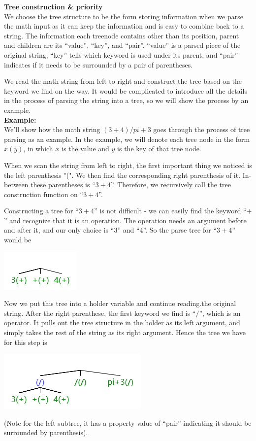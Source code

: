 \documentclass[11pt]{article}
\theoremstyle{definition}
\begin{document}
\begin{enumerate}
\textbf{Tree construction \& priority} \\
We choose the tree structure to be the form storing information when we parse the math input as it can keep the information and is easy to combine back to a string. The information each treenode contains other than its position, parent and children are its “value”, “key”, and “pair”.  “value” is a parsed piece of the original string, “key” tells which keyword is used under its parent, and “pair” indicates if it needs to be surrounded by a pair of parentheses.

We read the math string from left to right and construct the tree based on the keyword we find on the way. It would be complicated to introduce all the details in the process of parsing the string into a tree, so we will show the process by an example. \\

\textbf{Example:} \\
We’ll show how the math string $(3+4)/pi + 3$ goes through the process of tree parsing as an example. In the example, we will denote each tree node in the form $x(y)$, in which $x$ is the value and $y$ is the key of that tree node. 

When we scan the string from left to right, the first important thing we noticed is the left parenthesis "(". We then find the corresponding right parenthesis of it. In-between these parentheses is “$3+4$”. Therefore, we recursively call the tree construction function on “$3+4$”. 

Constructing a tree for “$3+4$” is not difficult - we can easily find the keyword “$+$” and recognize that it is an operation. The operation needs an argument before and after it, and our only choice is “$3$” and “$4$”. So the parse tree for “$3+4$” would be 
\begin{center}
\includegraphics[scale=0.8]{image5.png} 
\end{center}
Now we put this tree into a holder variable and continue reading.the original string. After the right parenthese, the first keyword we find is “$/$”, which is an operator. It pulls out the tree structure in the holder as its left argument, and simply takes the rest of the string as its right argument. Hence the tree we have for this step is 
\begin{center}
\includegraphics[scale=0.7]{image10.png} 
\end{center}
(Note for the left subtree, it has a property value of “pair” indicating it should be surrounded by parenthesis).


\end{enumerate}
\end{document}
